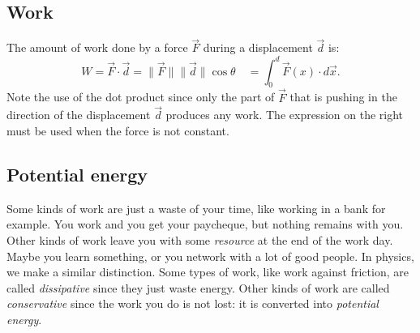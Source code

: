 \documentclass[letterpaper,9pt,journal]{IEEEtran}
\newcommand{\dokutitleleveltree}[1]{\subsection{#1}}
\newcommand{\dokuitalic}[1]{\textsl{#1}}
\begin{document}



%




%
\dokutitleleveltree{Work}

The amount of work done by a force $\vec{F}$ during a displacement $\vec{d}$ is:
\[
  W  = \vec{F}\cdot \vec{d} = \|\vec{F}\|\|\vec{d}\|\cos\theta \quad = \int_0^d \vec{F}(x)\cdot d\vec{x}.
\]
Note the use of the dot product since only the part of $\vec{F}$ that is pushing in the direction 
of the displacement $\vec{d}$ produces any work.
The expression on the right must be used when the force is not constant.


\dokutitleleveltree{Potential energy}

Some kinds of work are just a waste of your time, like working in a bank for example. 
You work and you get your paycheque, but nothing remains with you.
Other kinds of work leave you with some \dokuitalic{resource} at the end of the work day.
Maybe you learn something, or you network with a lot of good people.
In physics, we make a similar distinction. 
Some types of work, like work against friction, 
are called \dokuitalic{dissipative} since they just waste energy.
Other kinds of work are called \dokuitalic{conservative} since the work you do
is not lost: it is converted into \dokuitalic{potential energy}.
\end{document}
